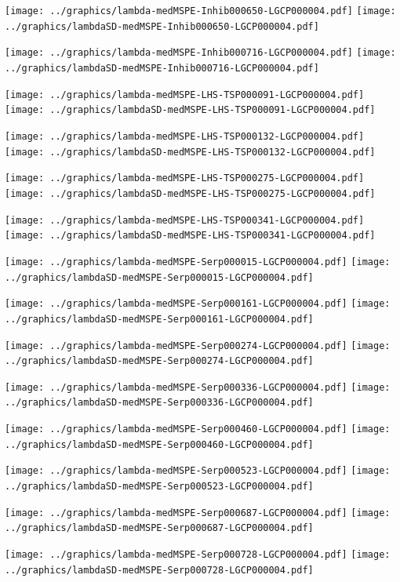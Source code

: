 \documentclass[review]{elsarticle}
\begin{document}
\texttt{[image: ../graphics/lambda-medMSPE-Inhib000650-LGCP000004.pdf]}
\texttt{[image: ../graphics/lambdaSD-medMSPE-Inhib000650-LGCP000004.pdf]}

\texttt{[image: ../graphics/lambda-medMSPE-Inhib000716-LGCP000004.pdf]}
\texttt{[image: ../graphics/lambdaSD-medMSPE-Inhib000716-LGCP000004.pdf]}

\texttt{[image: ../graphics/lambda-medMSPE-LHS-TSP000091-LGCP000004.pdf]}
\texttt{[image: ../graphics/lambdaSD-medMSPE-LHS-TSP000091-LGCP000004.pdf]}

\texttt{[image: ../graphics/lambda-medMSPE-LHS-TSP000132-LGCP000004.pdf]}
\texttt{[image: ../graphics/lambdaSD-medMSPE-LHS-TSP000132-LGCP000004.pdf]}

\texttt{[image: ../graphics/lambda-medMSPE-LHS-TSP000275-LGCP000004.pdf]}
\texttt{[image: ../graphics/lambdaSD-medMSPE-LHS-TSP000275-LGCP000004.pdf]}

\texttt{[image: ../graphics/lambda-medMSPE-LHS-TSP000341-LGCP000004.pdf]}
\texttt{[image: ../graphics/lambdaSD-medMSPE-LHS-TSP000341-LGCP000004.pdf]}

\texttt{[image: ../graphics/lambda-medMSPE-Serp000015-LGCP000004.pdf]}
\texttt{[image: ../graphics/lambdaSD-medMSPE-Serp000015-LGCP000004.pdf]}

\texttt{[image: ../graphics/lambda-medMSPE-Serp000161-LGCP000004.pdf]}
\texttt{[image: ../graphics/lambdaSD-medMSPE-Serp000161-LGCP000004.pdf]}

\texttt{[image: ../graphics/lambda-medMSPE-Serp000274-LGCP000004.pdf]}
\texttt{[image: ../graphics/lambdaSD-medMSPE-Serp000274-LGCP000004.pdf]}

\texttt{[image: ../graphics/lambda-medMSPE-Serp000336-LGCP000004.pdf]}
\texttt{[image: ../graphics/lambdaSD-medMSPE-Serp000336-LGCP000004.pdf]}

\texttt{[image: ../graphics/lambda-medMSPE-Serp000460-LGCP000004.pdf]}
\texttt{[image: ../graphics/lambdaSD-medMSPE-Serp000460-LGCP000004.pdf]}

\texttt{[image: ../graphics/lambda-medMSPE-Serp000523-LGCP000004.pdf]}
\texttt{[image: ../graphics/lambdaSD-medMSPE-Serp000523-LGCP000004.pdf]}

\texttt{[image: ../graphics/lambda-medMSPE-Serp000687-LGCP000004.pdf]}
\texttt{[image: ../graphics/lambdaSD-medMSPE-Serp000687-LGCP000004.pdf]}

\texttt{[image: ../graphics/lambda-medMSPE-Serp000728-LGCP000004.pdf]}
\texttt{[image: ../graphics/lambdaSD-medMSPE-Serp000728-LGCP000004.pdf]}
\end{document}
